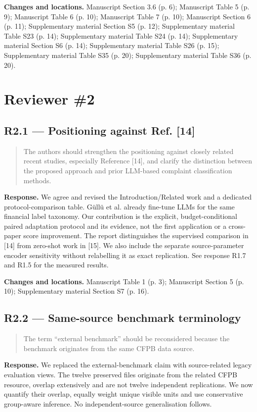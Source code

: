 \documentclass[11pt,a4paper]{article}
\begin{document}
\textbf{Changes and locations.} Manuscript Section 3.6 (p. 6); Manuscript Table 5 (p. 9); Manuscript Table 6 (p. 10); Manuscript Table 7 (p. 10); Manuscript Section 6 (p. 11); Supplementary material Section S5 (p. 12); Supplementary material Table S23 (p. 14); Supplementary material Table S24 (p. 14); Supplementary material Section S6 (p. 14); Supplementary material Table S26 (p. 15); Supplementary material Table S35 (p. 20); Supplementary material Table S36 (p. 20).

\section*{Reviewer \#2}

\subsection*{R2.1 — Positioning against Ref. [14]}
\begin{quote}\small The authors should strengthen the positioning against closely related recent studies, especially Reference [14], and clarify the distinction between the proposed approach and prior LLM-based complaint classification methods.\end{quote}
\textbf{Response.} We agree and revised the Introduction/Related work and a dedicated protocol-comparison table. Güllü et al. already fine-tune LLMs for the same financial label taxonomy. Our contribution is the explicit, budget-conditional paired adaptation protocol and its evidence, not the first application or a cross-paper score improvement. The report distinguishes the supervised comparison in [14] from zero-shot work in [15]. We also include the separate source-parameter encoder sensitivity without relabelling it as exact replication. See response R1.7 and R1.5 for the measured results.

\textbf{Changes and locations.} Manuscript Table 1 (p. 3); Manuscript Section 5 (p. 10); Supplementary material Section S7 (p. 16).

\subsection*{R2.2 — Same-source benchmark terminology}
\begin{quote}\small The term “external benchmark” should be reconsidered because the benchmark originates from the same CFPB data source.\end{quote}
\textbf{Response.} We replaced the external-benchmark claim with source-related legacy evaluation views. The twelve preserved files originate from the related CFPB resource, overlap extensively and are not twelve independent replications. We now quantify their overlap, equally weight unique visible units and use conservative group-aware inference. No independent-source generalisation follows.
\end{document}
